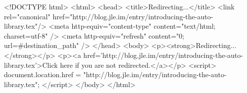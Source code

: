 <!DOCTYPE html>
<html>
<head>
<title>Redirecting...</title>
<link rel="canonical" href="http://blog.jle.im/entry/introducing-the-auto-library.tex"/>
<meta http-equiv="content-type" content="text/html; charset=utf-8" />
<meta http-equiv="refresh" content="0; url=#{destination_path}" />
</head>
<body>
  <p><strong>Redirecting...</strong></p>
  <p><a href='http://blog.jle.im/entry/introducing-the-auto-library.tex'>Click here if you are not redirected.</a></p>
  <script>
    document.location.href = "http://blog.jle.im/entry/introducing-the-auto-library.tex";
  </script>
</body>
</html>
